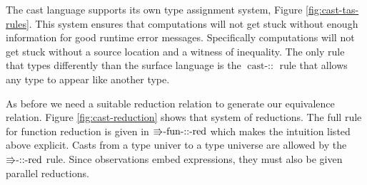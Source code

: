 The cast language supports its own type assignment system, Figure
\ref{fig:cast-tas-rules}. This system ensures that computations will
not get stuck without enough information for good runtime error messages.
Specifically computations will not get stuck without a source location
and a witness of inequality. The only rule that types differently
than the surface language is the $\operatorname{cast-::}$ rule that
allows any type to appear like another type. 

As before we need a suitable reduction relation to generate our equivalence
relation. Figure \ref{fig:cast-reduction} shows that system of reductions.
The full rule for function reduction is given in $\textrm{\ensuremath{\Rrightarrow}-fun-::-red}$
which makes the intuition listed above explicit. Casts from a type
univer to a type universe are allowed by the $\textrm{\ensuremath{\Rrightarrow}-::-red}$
rule. Since observations embed expressions, they must also be given
parallel reductions.

